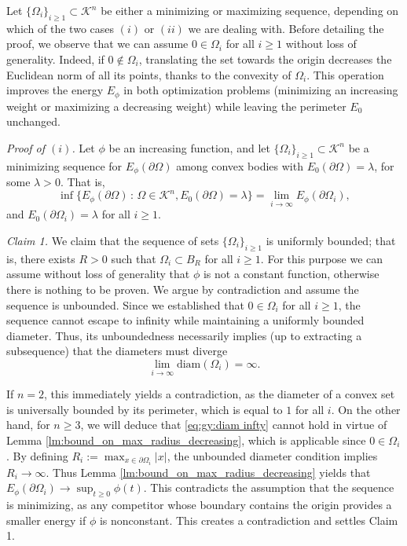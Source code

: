 \documentclass[10pt,leqno]{amsart}
\makeatletter
\newcommand{\p}{\partial}
\numberwithin{Theorem}{section}
\theoremstyle{definition}
\theoremstyle{remark}
\numberwithin{equation}{section}
\numberwithin{equation}{section}
\newenvironment{customproof}[1]{%
  \par\pushQED{\qed}%
  \normalfont\topsep6pt \trivlist
  \item[\hskip\labelsep\itshape
    Proof of #1\@addpunct{.}]\ignorespaces
}{%
  \popQED\endtrivlist\@endpefalse
}
\makeatother
\begin{document}
\begin{customproof}{Theorem \ref{Thm:intro:existence1}}
Let $\{\Omega_i\}_{i\geq1}\subset\mathcal{K}^n$ be either a minimizing or maximizing sequence, depending on which of the two cases $(i)$ or $(ii)$ we are dealing with. 
Before detailing the proof, we observe that we can assume $0 \in {\Omega_i}$ for all $i \ge 1$ without loss of generality. Indeed, if $0 \notin {\Omega_i}$, translating the set towards the origin decreases the Euclidean norm of all its points, thanks to the convexity of $\Omega_i$. This operation improves the energy $E_\phi$ in both optimization problems (minimizing an increasing weight or maximizing a decreasing weight) while leaving the perimeter $E_0$ unchanged.

\smallskip
\textit{Proof of $(i)$.} Let $\phi$ be an increasing function, and let $\{\Omega_i\}_{i\geq 1}\subset\mathcal{K}^n$ be a minimizing sequence for $E_\phi(\p \Omega)$ among convex bodies with $E_0( \p \Omega)=\lambda$, for some $\lambda>0$. 
That is,
$$
\inf\{ E_\phi(\p \Omega) \, : \, \Omega \in \mathcal{K}^n, E_0( \p \Omega)=\lambda\}=\lim_{i\to\infty}E_\phi(\partial\Omega_i), 
$$
and $E_0( \p \Omega_i)=\lambda$ for all $i\geq 1$.

\textit{Claim 1.}  We claim that the sequence of sets $\{\Omega_i\}_{i\geq 1}$ is uniformly bounded; that is, there exists $R>0$ such that $\Omega_i\subset B_R$ for all $i\geq 1$. For this purpose we can assume
without loss of generality that $\phi$ is not a constant function, otherwise there is nothing to be proven.
We argue by contradiction and assume the sequence is unbounded. 
Since we established that $0 \in {\Omega_i}$ for all $i\geq1$, the sequence cannot escape to infinity while maintaining a uniformly bounded diameter. Thus, its unboundedness necessarily implies (up to extracting a subsequence) that the diameters must diverge
\begin{equation}\label{eq:gy:diam infty}
\lim_{i\to\infty}\text{diam}(\Omega_i)=\infty.
\end{equation}

If $n=2$, this immediately yields a contradiction, as the diameter of a convex set is universally bounded by its perimeter, which is equal to  $1$ for all $i$. On the other hand, for $n\geq 3$, we will deduce that \eqref{eq:gy:diam infty} cannot hold in virtue of Lemma \ref{lm:bound_on_max_radius_decreasing}, which is applicable since $0 \in {\Omega_i}$. By defining $R_i := \max_{x \in \partial\Omega_i} |x|$, the unbounded diameter condition implies $R_i \to \infty$. Thus Lemma \ref{lm:bound_on_max_radius_decreasing} yields that $E_\phi(\p \Omega_i) \to \sup_{t\geq 0} \phi(t)$. This contradicts the assumption that the sequence is minimizing, as any  competitor whose boundary contains the origin provides a smaller energy if $\phi$ is nonconstant. This creates a contradiction and settles Claim 1.


\end{customproof}
\end{document}
